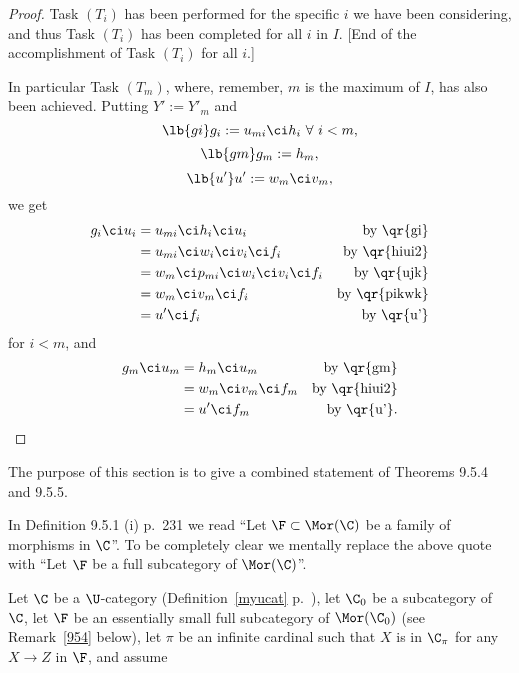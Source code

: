 \documentclass[12pt]{article}
\theoremstyle{remark}
\theoremstyle{definition}
\begin{document}
\begin{proof}
Task $(T_i)$ has been performed for the specific $i$ we have been considering, and thus Task $(T_i)$ has been completed for all $i$ in $I$. [End of the accomplishment of Task $(T_i)$ for all $i$.]

In particular Task $(T_m)$, where, remember, $m$ is the maximum of $I$, has also been achieved. Putting $Y':=Y'_m$ and 
\begin{equation}\lb{gi}
g_i:=u_{mi}\ci h_i\ \forall\ i<m,
\end{equation} 
\begin{equation}\lb{gm}
g_m:=h_m,
\end{equation} 
\begin{equation}\lb{u'}
u':=w_m\ci v_m,
\end{equation} 
we get 
\begin{align*}
g_i\ci u_i&=u_{mi}\ci h_i\ci u_i&\text{by \qr{gi}}\\ 
&=u_{mi}\ci w_i\ci v_i\ci f_i&\text{by \qr{hiui2}}\\ 
&=w_m\ci p_{mi}\ci w_i\ci v_i\ci f_i&\text{by \qr{ujk}}\\ 
&=w_m\ci v_m\ci f_i&\text{by \qr{pikwk}}\\ 
&=u'\ci f_i&\text{by \qr{u'}}
\end{align*} 
for $i<m$, and 
\begin{align*}
g_m\ci u_m&=h_m\ci u_m&\text{by \qr{gm}}\\ 
&=w_m\ci v_m\ci f_m&\text{by \qr{hiui2}}\\ 
&=u'\ci f_m&\text{by \qr{u'}}.
\end{align*}
\end{proof}



The purpose of this section is to give a combined statement of Theorems 9.5.4 and 9.5.5.

\begin{rk}
In Definition 9.5.1 (i) p.~231 we read ``Let $\F\subset\Mor(\C)$ be a family of morphisms in $\C$''. To be completely clear we mentally replace the above quote with ``Let $\F$ be a full subcategory of $\Mor(\C)$''.
\end{rk} 

Let $\C$ be a $\U$-category (Definition~\ref{myucat} p.~), let $\C_0$ be a subcategory of $\C$, let $\F$ be an essentially small full subcategory of $\Mor(\C_0)$ (see Remark~\ref{954} below), let $\pi$ be an infinite cardinal such that $X$ is in $\C_\pi$ for any $X\to Z$ in $\F$, and assume 
\end{document}
